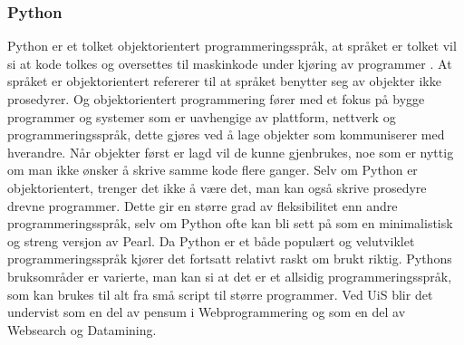 \documentclass{article}
\begin{document}
\subsubsection{Python}
Python er et tolket objektorientert programmeringsspråk, at språket er tolket vil si at kode tolkes og oversettes til maskinkode under kjøring av programmer\cite{grunnleggendepython} . At språket er objektorientert refererer til at språket benytter seg av objekter ikke prosedyrer. Og objektorientert programmering fører med et fokus på bygge programmer og systemer som er uavhengige av plattform, nettverk og programmeringsspråk, dette gjøres ved å lage objekter som kommuniserer med hverandre. Når objekter først er lagd vil de kunne gjenbrukes, noe som er nyttig om man ikke ønsker å skrive samme kode flere ganger. Selv om Python er objektorientert, trenger det ikke å være det, man kan også skrive prosedyre drevne programmer. Dette gir en større grad av fleksibilitet enn andre programmeringsspråk, selv om Python ofte kan bli sett på som en minimalistisk og streng versjon av Pearl. Da Python er et både populært og velutviklet programmeringsspråk kjører det fortsatt relativt raskt om brukt riktig. Pythons bruksområder er varierte, man kan si at det er et allsidig programmeringsspråk, som kan brukes til alt fra små script til større programmer. Ved UiS blir det undervist som en del av pensum i Webprogrammering og som en del av Websearch og Datamining. 
\end{document}
